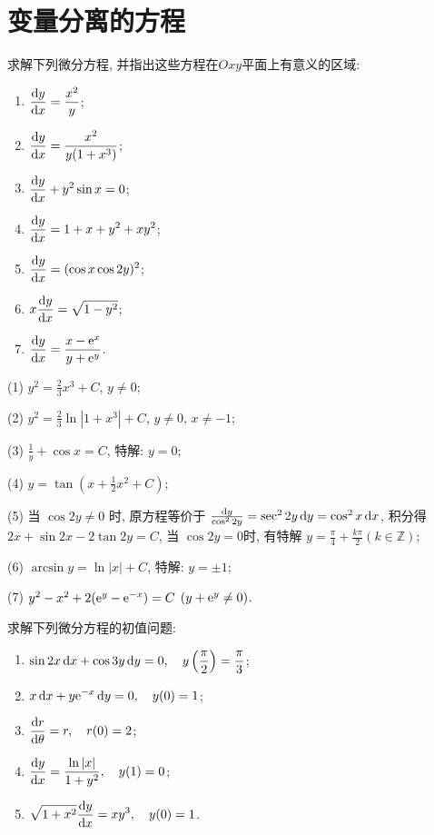 \section{变量分离的方程}



\begin{exercise}
  求解下列微分方程, 并指出这些方程在$Oxy$平面上有意义的区域:
  \begin{enumerate}[(1)]
  \item $\displaystyle\frac{\mathop{}\!\mathrm{d} y}{\mathop{}\!\mathrm{d} x}=\frac{x^2}{y}$;
  \item $\displaystyle\frac{\mathop{}\!\mathrm{d} y}{\mathop{}\!\mathrm{d} x}=\frac{x^2}{y(1+x^3)}$;
  \item $\displaystyle\frac{\mathop{}\!\mathrm{d} y}{\mathop{}\!\mathrm{d} x}+y^2\sin x=0$;
  \item $\displaystyle\frac{\mathop{}\!\mathrm{d} y}{\mathop{}\!\mathrm{d} x}=1+x+y^2+xy^2$;
  \item $\displaystyle\frac{\mathop{}\!\mathrm{d} y}{\mathop{}\!\mathrm{d} x}=(\cos x\cos 2y)^2$;
  \item $\displaystyle x\frac{\mathop{}\!\mathrm{d} y}{\mathop{}\!\mathrm{d} x}=\sqrt{1-y^2}$;
  \item $\displaystyle\frac{\mathop{}\!\mathrm{d} y}{\mathop{}\!\mathrm{d} x}=\frac{x-\mathrm{e}^x}{y+\mathrm{e}^y}$.
  \end{enumerate}
\end{exercise}

\begin{solution}
  (1) $y^2=\frac{2}{3}x^3+C$, $y\neq 0$;

  (2) $y^2=\frac{2}{3}\ln|1+x^3|+C$, $y\neq 0$, $x\neq-1$;

  (3) $\frac{1}{y}+\cos x=C$, 特解: $y=0$;

  (4) $y=\tan(x+\frac{1}{2}x^2+C)$;

  (5) 当 $\cos 2y\neq 0$ 时, 原方程等价于 $\frac{\mathop{}\!\mathrm{d} y}{\cos^2 2y}=\sec^2 2y\mathop{}\!\mathrm{d} y=\cos^2x\mathop{}\!\mathrm{d} x$, 
  积分得 $2x+\sin2x-2\tan2y=C$, 当 $\cos2y=0$时, 有特解 $y=\frac{\pi}{4}+\frac{k\pi}{2}(k\in\mathbb{Z})$;

  (6) $\arcsin y=\ln|x|+C$, 特解: $y=\pm 1$;

  (7) $y^2-x^2+2(\mathrm{e}^y-\mathrm{e}^{-x})=C$ $(y+\mathrm{e}^y\neq 0)$.
\end{solution}



\begin{exercise}
  求解下列微分方程的初值问题:
  \begin{enumerate}[(1)]
  \item $\displaystyle\sin 2x\mathop{}\!\mathrm{d} x+\cos 3y\mathop{}\!\mathrm{d} y=0,\quad y\left(\frac{\pi}{2}\right)=\frac{\pi}{3}$;
  \item $\displaystyle x\mathop{}\!\mathrm{d} x+y\mathrm{e}^{-x}\mathop{}\!\mathrm{d} y=0,\quad y(0)=1$;
  \item $\displaystyle\frac{\mathop{}\!\mathrm{d} r}{\mathop{}\!\mathrm{d}\theta}=r,\quad r(0)=2$;
  \item $\displaystyle\frac{\mathop{}\!\mathrm{d} y}{\mathop{}\!\mathrm{d} x}=\frac{\ln|x|}{1+y^2},\quad y(1)=0$;
  \item $\displaystyle\sqrt{1+x^2}\frac{\mathop{}\!\mathrm{d} y}{\mathop{}\!\mathrm{d} x}=xy^3,\quad y(0)=1$.
  \end{enumerate}
\end{exercise}

